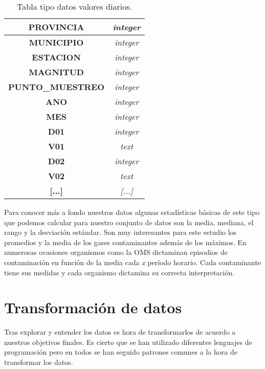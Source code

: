 \begin{table}[H]
	\begin{center}
		\begin{tabular}{|c|c|}
			\hline
			\textbf{PROVINCIA}       & \textit{integer}              \\ \hline
			\textbf{MUNICIPIO}       & \textit{integer}              \\ \hline
			\textbf{ESTACION}        & \textit{integer}               \\ \hline
			\textbf{MAGNITUD}        & \textit{integer}               \\ \hline
			\textbf{PUNTO\_MUESTREO} & \textit{integer} \\ \hline
			\textbf{ANO}             & \textit{integer}            \\ \hline
			\textbf{MES}             & \textit{integer}               \\ \hline
			\textbf{D01}             & \textit{integer}              \\ \hline
			\textbf{V01}             & \textit{text}               \\ \hline
			\textbf{D02}             & \textit{integer}              \\ \hline
			\textbf{V02}             & \textit{text}               \\ \hline
			\textbf{[...]}             & \textit{[...]}               \\ \hline
		\end{tabular}
		\caption{Tabla tipo datos valores diarios.}
	\end{center}
\end{table}

Para conocer más a fondo nuestros datos algunas estadísticas básicas de este tipo que podemos calcular para nuestro conjunto de datos son la media, mediana, el rango y la desviación estándar. Son muy interesantes para este estudio los promedios y la media de los gases contaminantes además de los máximos. En numerosas ocasiones organismos como la OMS \cite{oms_1} dictaminan episodios de contaminación en función de la media cada\textit{ x} período horario. Cada contaminante tiene sus medidas y cada organismo dictamina su correcta interpretación.

 
\section{Transformación de datos}
Tras explorar y entender los datos es hora de transformarlos de acuerdo a nuestros objetivos finales. Es cierto que se han utilizado diferentes lenguajes de programación pero en todos se han seguido patrones comunes a la hora de transformar los datos.

